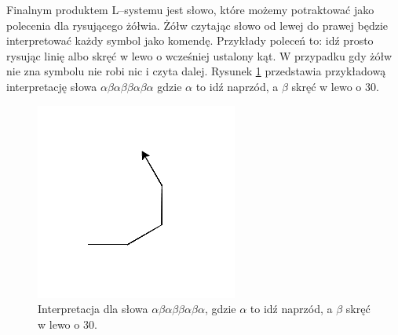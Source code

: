 \documentclass[inz,longabstract]{iithesis}
\begin{document}
        Finalnym produktem L--systemu jest słowo, które możemy potraktować jako polecenia dla rysującego żółwia. Żółw czytając słowo od lewej do prawej będzie interpretować każdy symbol jako komendę. Przykłady poleceń to: idź prosto rysując linię albo skręć w lewo o wcześniej ustalony kąt. W przypadku gdy żółw nie zna symbolu nie robi nic i czyta dalej. Rysunek \ref{fig:turtleExample} przedstawia przykładową interpretację słowa $\alpha\beta\alpha\beta\beta\alpha\beta\alpha$ gdzie $\alpha$ to idź naprzód, a $\beta$ skręć w lewo o 30\degree.
        \begin{figure}[h]
            \centering
            \includegraphics[width=0.4\linewidth]{turtleExample.png}
            \caption{Interpretacja dla słowa $\alpha\beta\alpha\beta\beta\alpha\beta\alpha$, gdzie $\alpha$ to idź naprzód, a $\beta$ skręć w lewo o 30\degree.}
            \label{fig:turtleExample}
        \end{figure}
        
\end{document}
